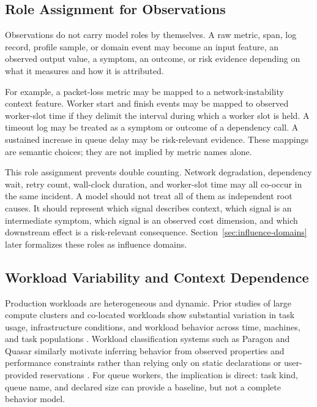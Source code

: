 \subsection{Role Assignment for Observations}
\label{sec:background-role-assignment}

Observations do not carry model roles by themselves. A raw metric, span, log
record, profile sample, or domain event may become an input feature, an observed
output value, a symptom, an outcome, or risk evidence depending on what it
measures and how it is attributed.

For example, a packet-loss metric may be mapped to a network-instability context
feature. Worker start and finish events may be mapped to observed worker-slot
time if they delimit the interval during which a worker slot is held. A timeout
log may be treated as a symptom or outcome of a dependency call. A sustained
increase in queue delay may be risk-relevant evidence. These mappings are
semantic choices; they are not implied by metric names alone.

This role assignment prevents double counting. Network degradation, dependency
wait, retry count, wall-clock duration, and worker-slot time may all co-occur in
the same incident. A model should not treat all of them as independent root
causes. It should represent which signal describes context, which signal is an
intermediate symptom, which signal is an observed cost dimension, and which
downstream effect is a risk-relevant consequence. Section~\ref{sec:influence-domains}
later formalizes these roles as influence domains.

\subsection{Workload Variability and Context Dependence}
\label{sec:background-workload-variability}

Production workloads are heterogeneous and dynamic. Prior studies of large
compute clusters and co-located workloads show substantial variation in task
usage, infrastructure conditions, and workload behavior across time, machines,
and task populations
\cite{zhang2011taskusage,reiss2012heterogeneity,cheng2018alibaba}. Workload
classification systems such as Paragon and Quasar similarly motivate inferring
behavior from observed properties and performance constraints rather than
relying only on static declarations or user-provided reservations
\cite{delimitrou2013paragon,delimitrou2014quasar}. For queue workers, the
implication is direct: task kind, queue name, and declared size can provide a
baseline, but not a complete behavior model.


